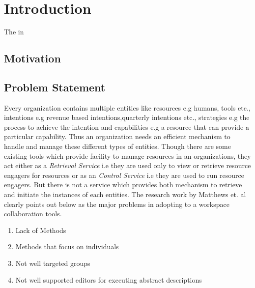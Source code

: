 \chapter{Introduction}
\label{chap:introduction}

The in


\section{Motivation}
\label{sec:motivation}

  


\section{Problem Statement}
\label{sec:problemstatement}
 Every organization contains multiple entities like resources e.g humans, tools etc., intentions e.g revenue based intentions,quarterly intentions etc., strategies e.g the process to achieve the intention and capabilities e.g a resource that can provide a particular capability. Thus an organization needs an efficient mechanism to handle and manage these different types of entities. Though there are some existing tools which provide facility to manage resources in an organizations, they act either as a \textit{Retrieval Service} i.e they are used only to view or retrieve resource engagers for resources or as an \textit{Control Service} i.e they are used to run resource engagers. But there is not a service which provides both mechanism to retrieve and initiate the instances of each entities. The research work by Matthews et. al \cite{Matthews2011}  clearly points out below as the major problems in adopting to a workspace collaboration tools.

\begin{enumerate}
	\item Lack of Methods
	\item Methods that focus on individuals
	\item Not well targeted groups
	\item Not well supported editors for executing abstract descriptions
\end{enumerate}

